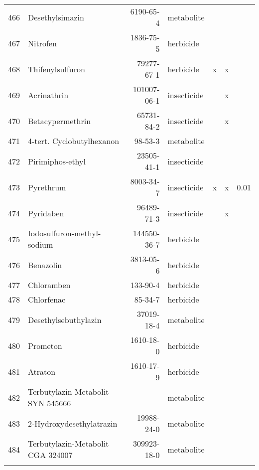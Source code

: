 \begin{longtable}{lp{3cm}rlp{0.5cm}p{0.5cm}p{1cm}}
  466 & Desethylsimazin & 6190-65-4 & metabolite &  &  &  \\ 
  467 & Nitrofen & 1836-75-5 & herbicide &  &  &  \\ 
  468 & Thifenylsulfuron & 79277-67-1 & herbicide & x & x &  \\ 
  469 & Acrinathrin & 101007-06-1 & insecticide &  & x &  \\ 
  470 & Betacypermethrin & 65731-84-2 & insecticide &  & x &  \\ 
  471 & 4-tert. Cyclobutylhexanon & 98-53-3 & metabolite &  &  &  \\ 
  472 & Pirimiphos-ethyl & 23505-41-1 & insecticide &  &  &  \\ 
  473 & Pyrethrum & 8003-34-7 & insecticide & x & x & 0.01 \\ 
  474 & Pyridaben & 96489-71-3 & insecticide &  & x &  \\ 
  475 & Iodosulfuron-methyl-sodium & 144550-36-7 & herbicide &  &  &  \\ 
  476 & Benazolin & 3813-05-6 & herbicide &  &  &  \\ 
  477 & Chloramben & 133-90-4 & herbicide &  &  &  \\ 
  478 & Chlorfenac & 85-34-7 & herbicide &  &  &  \\ 
  479 & Desethylsebuthylazin & 37019-18-4 & metabolite &  &  &  \\ 
  480 & Prometon & 1610-18-0 & herbicide &  &  &  \\ 
  481 & Atraton & 1610-17-9 & herbicide &  &  &  \\ 
  482 & Terbutylazin-Metabolit SYN 545666 &  & metabolite &  &  &  \\ 
  483 & 2-Hydroxydesethylatrazin & 19988-24-0 & metabolite &  &  &  \\ 
  484 & Terbutylazin-Metabolit CGA 324007 & 309923-18-0 & metabolite &  &  &  \\ 
  \label{tab:phch_var}
\end{longtable}
\endgroup
